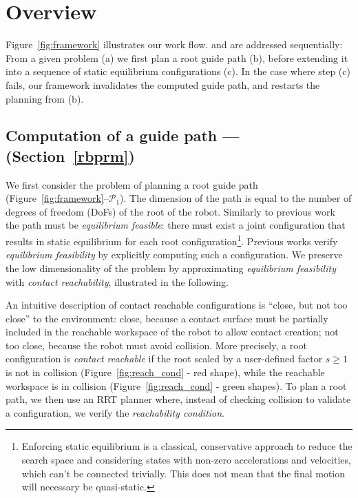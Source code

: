\section{Overview}
\label{overview}


Figure~\ref{fig:framework} illustrates our work flow.
\Pa and \Pb are addressed sequentially: From a given problem (a) we first plan a root guide path (b), before
extending it into a sequence of static equilibrium configurations (c). In the case where step (c) fails,
our framework invalidates the computed guide path, and restarts the planning from (b).

%

\subsection{Computation of a guide path --- \Pa (Section~\ref{rbprm})}
We first consider the problem of planning a root guide path (Figure~\ref{fig:framework}--$\mathcal{P}_1$).  The dimension of the path is equal to the number of degrees of freedom (DoFs) of the root of the robot.
Similarly to previous work~\citep{Bouyarmane2009} the path must be \textit{equilibrium feasible}: there must exist a joint configuration that results in static equilibrium for each root configuration\footnote{Enforcing static equilibrium is a classical, conservative approach to reduce the search space and considering states  with non-zero accelerations and velocities, which can't be connected trivially. This does not mean that the final motion will necessary be quasi-static.}. Previous works verify \textit{equilibrium feasibility} by explicitly computing such a configuration. We preserve the low dimensionality of the problem by approximating \textit{equilibrium feasibility} with \textit{contact reachability}, illustrated in the following.

An intuitive description of \gls{contact reachable} configurations is ``close, but not too close'' to the environment: close, because a contact surface must be partially included in the reachable workspace of the robot to allow contact creation; not too close, because the robot must avoid collision.
More precisely, a root configuration is \textit{contact reachable} if the root scaled by a user-defined factor $s \geq 1$ is not in collision (Figure~\ref{fig:reach_cond} - red shape), while the reachable workspace is in collision (Figure~\ref{fig:reach_cond} - green shapes).
To plan a root path, we then use an RRT planner where, instead of checking collision to validate a configuration, we verify the \textit{reachability condition}.

